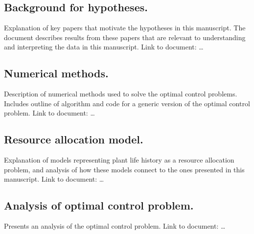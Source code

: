 \documentclass[12pt, oneside,titlepage]{article}   	%
\begin{document}
\subsection*{Background for hypotheses.} Explanation of key papers that motivate the hypotheses in this manuscript. The document describes results from these papers that are relevant to understanding and interpreting the data in this manuscript. Link to document: \dots

\subsection*{Numerical methods.} Description of numerical methods used to solve the optimal control problems. Includes outline of algorithm and code for a generic version of the optimal control problem. Link to document: \dots

\subsection*{Resource allocation model.} Explanation of models representing plant life history as a resource allocation problem, and analysis of how these models connect to the ones presented in this manuscript. Link to document: \dots

\subsection*{Analysis of optimal control problem.} Presents an analysis of the optimal control problem. Link to document: \dots
\end{document}
